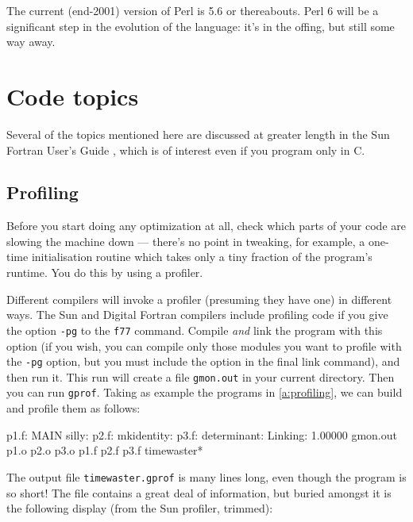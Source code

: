 \documentclass[11pt,oneside,chapters]{starlink}
\begin{document}
The current (end-2001) version of
Perl is 5.6 or thereabouts.  Perl 6 will be a
significant step in the evolution of the language: it's
in the offing, but still some way away.


\section{Code topics}
\label{s:codetopics}

Several of the topics mentioned here are discussed at greater length
in the Sun Fortran User's Guide \citep{sunf77}, which is of interest
even if you program only in C.

\subsection{Profiling}
\label{s:profiling}

Before you start doing any optimization at all, check which parts of
your code are slowing the machine down --- there's no point in
tweaking, for example, a one-time initialisation routine which takes
only a tiny fraction of the program's runtime.  You do this by using a
profiler.

Different compilers will invoke a profiler (presuming
they have one) in different ways.  The Sun and Digital
Fortran compilers include profiling code if you give the
option \texttt{-pg} to the \texttt{f77} command.
Compile \emph{and} link the program with this option (if
you wish, you can compile only those modules you want to
profile with the \texttt{-pg} option, but you must
include the option in the final link command), and then
run it.  This run will create a file \texttt{gmon.out}
in your current directory.  Then you can run
\texttt{gprof}.  Taking as example the programs in
\ref{a:profiling}, we can build and profile them as
follows:

\begin{terminalv}
p1.f:
MAIN silly:
p2.f:
mkidentity:
p3.f:
determinant:
Linking:
1.00000
gmon.out        p1.o            p2.o            p3.o
p1.f            p2.f            p3.f            timewaster*
\end{terminalv}

The output file \texttt{timewaster.gprof} is many lines long, even
though the program is so short!  The file contains a great deal of
information, but buried amongst it is the following display (from the
Sun profiler, trimmed):
\end{document}
